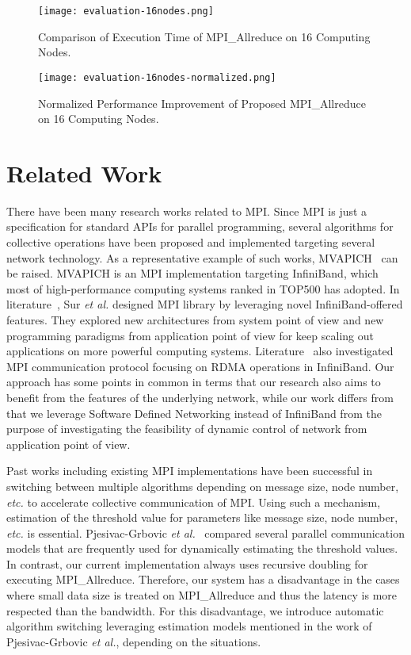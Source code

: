 \begin{figure}
    \centering
    \texttt{[image: evaluation-16nodes.png]}
    \caption{Comparison of Execution Time of MPI\_Allreduce on 16 Computing Nodes.}%
    \label{fig-evaluation-16nodes}
\end{figure}

\begin{figure}
    \centering
    \texttt{[image: evaluation-16nodes-normalized.png]}
    \caption{Normalized Performance Improvement of Proposed MPI\_Allreduce on 16 Computing Nodes.}%
    \label{fig-evaluation-16nodes-normalized}
\end{figure}

\section{Related Work}\label{iii-related-work}

There have been many research works related to MPI\@. Since MPI is just a
specification for standard APIs for parallel programming, several algorithms
for collective operations have been proposed and implemented targeting several
network technology. As a representative example of such works,
MVAPICH~\autocite{mvapich} can be raised. MVAPICH is an MPI implementation
targeting InfiniBand, which most of high-performance computing systems ranked
in TOP500 has adopted. In literature~\autocite{PjesivacGrbovic2011}, Sur \emph{et
al.} designed MPI library by leveraging novel InfiniBand-offered features.
They explored new architectures from system point of view and new programming
paradigms from application point of view for keep scaling out applications on
more powerful computing systems. Literature~\autocite{Jiuxing2004} also
investigated MPI communication protocol focusing on RDMA operations in
InfiniBand. Our approach has some points in common in terms that our research
also aims to benefit from the features of the underlying network, while our
work differs from that we leverage Software Defined Networking instead of
InfiniBand from the purpose of investigating the feasibility of dynamic
control of network from application point of view.

Past works including existing MPI implementations have been successful
in switching between multiple algorithms depending on message size, node
number, \emph{etc.} to accelerate collective communication of MPI\@. Using
such a mechanism, estimation of the threshold value for parameters like
message size, node number, \emph{etc.} is essential. Pjesivac-Grbovic \emph{et
al.}~\autocite{PjesivacGrbovic} compared several parallel communication models
that are frequently used for dynamically estimating the threshold values. In
contrast, our current implementation always uses recursive doubling for
executing MPI\_Allreduce. Therefore, our system has a disadvantage in the
cases where small data size is treated on MPI\_Allreduce and thus the latency
is more respected than the bandwidth. For this disadvantage, we introduce
automatic algorithm switching leveraging estimation models mentioned in the
work of Pjesivac-Grbovic \emph{et al.}, depending on the situations.

